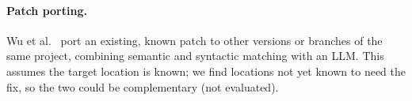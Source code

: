 \paragraph{Patch porting.} Wu et al.~\cite{wu2025mystique} port an
existing, known patch to other versions or branches of the same project,
combining semantic and syntactic matching with an LLM. This assumes the target location is known; we find locations not yet known
to need the fix, so the two could be complementary (not evaluated).
